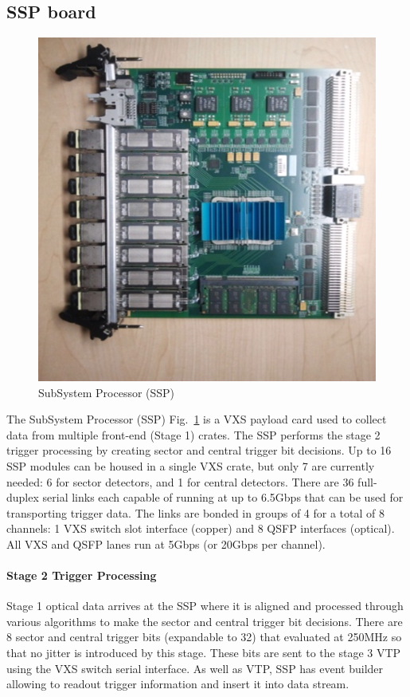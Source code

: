 \subsection{SSP board}

\begin{figure}[hbt]
	\centering
	\includegraphics[width=1.0\columnwidth,keepaspectratio]{img/ssp_board.png}
	\caption{SubSystem Processor (SSP)}
	\label{fig:ssp_board}
\end{figure}

The SubSystem Processor (SSP) Fig.~\ref{fig:ssp_board} is a VXS payload card used to collect data from multiple front-end (Stage 1) crates. The SSP performs the stage 2 trigger processing by creating sector and central trigger bit decisions. Up to 16 SSP modules can be housed in a single VXS crate, but only 7 are currently needed: 6 for sector detectors, and 1 for central detectors. There are 36 full-duplex serial links each capable of running at up to 6.5Gbps that can be used for transporting trigger data. The links are bonded in groups of 4 for a total of 8 channels: 1 VXS switch slot interface (copper) and 8 QSFP interfaces (optical). All VXS and QSFP lanes run at 5Gbps (or 20Gbps per channel).

\paragraph{Stage 2 Trigger Processing}
Stage 1 optical data arrives at the SSP where it is aligned and processed through various algorithms to make the sector and central trigger bit decisions. There are 8 sector and central trigger bits (expandable to 32) that evaluated at 250MHz so that no jitter is introduced by this stage. These bits are sent to the stage 3 VTP using the VXS switch serial interface. As well as VTP, SSP has event builder allowing to readout trigger information and insert it into data stream.
